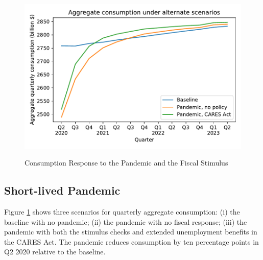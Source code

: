 \documentclass[titlepage,a4paper]{\econtex}
\begin{document}
\begin{figure}
  \centering
  \caption{Consumption Response to the Pandemic and the Fiscal Stimulus}
  \label{cons_response}
  { \includegraphics[width=8in]{./Figures/AggConResp_examples}}
\end{figure}

\subsection{Short-lived Pandemic}

Figure \ref{cons_response} shows three scenarios for quarterly aggregate consumption: (i) the baseline with no pandemic; (ii) the pandemic with no fiscal response; (iii) the pandemic with both the stimulus checks and extended unemployment benefits in the CARES Act.
The pandemic reduces consumption by ten percentage points in Q2 2020 relative to the baseline.
\end{document}
